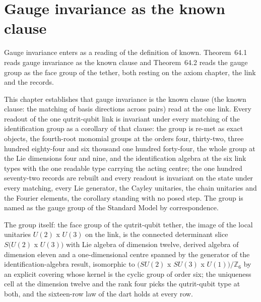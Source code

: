 \section{Gauge invariance as the known clause}\label{mod:IV-1-gauge-invariance-as-the-known-clause}
\label{narr:open:4-1}Gauge invariance enters as a reading of the definition of known. Theorem~64.1 reads gauge invariance as the known clause and Theorem~64.2 reads the gauge group as the face group of the tether, both resting on the axiom chapter, the link and the records.
\begin{chtheorem}\label{box:IV-1-gauge-invariance-as-the-known-clause:1}
This chapter establishes that gauge invariance is the known clause (the known clause: the matching of basis directions across pairs) read at the one link. Every readout of the one qutrit-qubit link is invariant under every matching of the identification group as a corollary of that clause: the group is re-met as exact objects, the fourth-root monomial groups at the orders four, thirty-two, three hundred eighty-four and six thousand one hundred forty-four, the whole group at the Lie dimensions four and nine, and the identification algebra at the six link types with the one readable type carrying the acting centre; the one hundred seventy-two records are rebuilt and every readout is invariant on the state under every matching, every Lie generator, the Cayley unitaries, the chain unitaries and the Fourier elements, the corollary standing with no posed step. The group is named as the gauge group of the Standard Model by correspondence.
\end{chtheorem}
\begin{chtheorem}\label{box:IV-1-gauge-invariance-as-the-known-clause:2}
The group itself: the face group of the qutrit-qubit tether, the image of the local unitaries $U(2)$ x $U(3)$ on the link, is the connected determinant slice $S(U(2)$ x $U(3))$ with Lie algebra of dimension twelve, derived algebra of dimension eleven and a one-dimensional centre spanned by the generator of the identification-algebra result, isomorphic to $(SU(2)$ x $SU(3)$ x $U(1))/\mathbb{Z}_6$ by an explicit covering whose kernel is the cyclic group of order six; the uniqueness cell at the dimension twelve and the rank four picks the qutrit-qubit type at both, and the sixteen-row law of the dart holds at every row.
\end{chtheorem}
